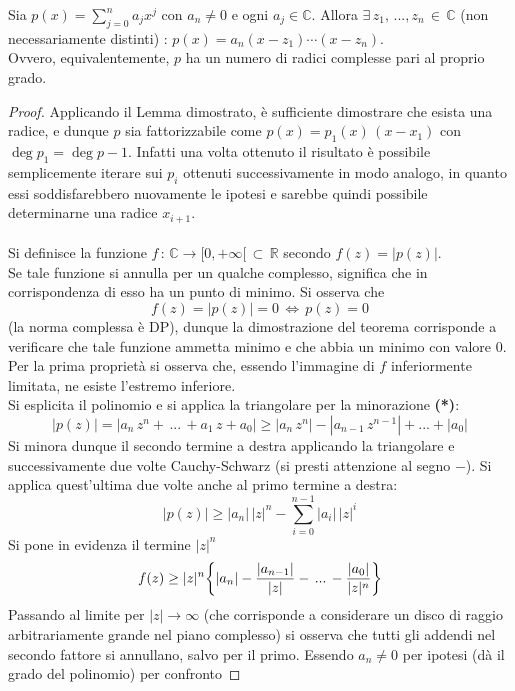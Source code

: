 \documentclass[10pt, oneside]{book}
\theoremstyle{plain}
\begin{document}
\begin{ther}
Sia $p(x) = \sum\limits_{j=0}^n a_j x^j$ con $a_n \neq 0$ e ogni $a_j \in \mathbb{C}$. Allora $\exists \, z_1, \, ..., z_n \, \in \, \mathbb{C}$ (non necessariamente distinti) : $p(x) = a_n(x-z_1) \cdots (x - z_n)$.
\\Ovvero, equivalentemente, $p$ ha un numero di radici complesse pari al proprio grado.
\end{ther}
\begin{proof}
Applicando il Lemma dimostrato, è sufficiente dimostrare che esista una radice, e dunque $p$ sia fattorizzabile come $p(x) = p_1(x) \, (x-x_1)$ con $\deg p_1 = \deg p - 1$. Infatti una volta ottenuto il risultato è possibile semplicemente iterare sui $p_i$ ottenuti successivamente in modo analogo, in quanto essi soddisfarebbero nuovamente le ipotesi e sarebbe quindi possibile determinarne una radice $x_{i+1}$.
\\~\\Si definisce la funzione $f \, : \, \mathbb{C} \rightarrow [0, +\infty[ \, \subset \, \mathbb{R}$ secondo $f(z) = |p(z)|$.
\\Se tale funzione si annulla per un qualche complesso, significa che in corrispondenza di esso ha un punto di minimo. Si osserva che 
\[f(z) = |p(z)| = 0 \, \Longleftrightarrow \, p(z) = 0\]
(la norma complessa è DP), dunque la dimostrazione del teorema corrisponde a verificare che tale funzione ammetta minimo e che abbia un minimo con valore $0$.
\\Per la prima proprietà si osserva che, essendo l'immagine di $f$ inferiormente limitata, ne esiste l'estremo inferiore.
\\Si esplicita il polinomio e si applica la triangolare per la minorazione \textbf{(*)}:
\[|p(z)| = |a_n \, z^n + \, ...\, + a_1 \, z + a_0| \geq |a_n \, z^n| - |a_{n-1}\, z^{n-1}| + ... + |a_0|\]
Si minora dunque il secondo termine a destra applicando la triangolare e successivamente due volte Cauchy-Schwarz (si presti attenzione al segno $-$). Si applica quest'ultima due volte anche al primo termine a destra:
\[|p(z)| \geq |a_n| \, |z|^n - \sum\limits_{i=0}^{n-1} |a_i| \, |z|^i\]
Si pone in evidenza il termine $|z|^n$
\[f(z) \geq |z|^n \bigg{ \{ }|a_n| - \frac{|a_{n-1}|}{|z|} - \, ...\, - \frac{|a_0|}{|z|^n} \bigg{ \} }\]
Passando al limite per $|z| \rightarrow \infty$ (che corrisponde a considerare un disco di raggio arbitrariamente grande nel piano complesso) si osserva che tutti gli addendi nel secondo fattore si annullano, salvo per il primo. Essendo $a_n \neq 0$ per ipotesi (dà il grado del polinomio) per confronto

\end{proof}
\end{document}
